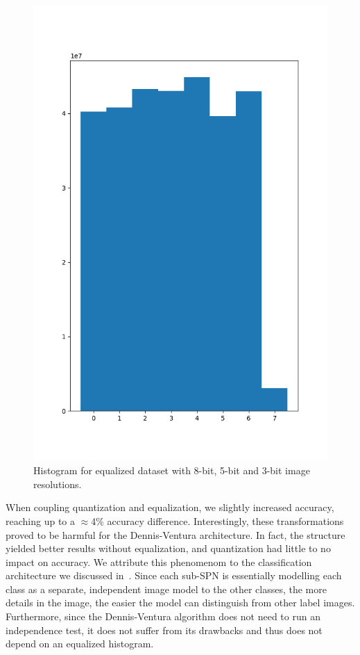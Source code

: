 \begin{figure}[h]
  \includegraphics[scale=0.3]{imgs/hist_3_eq.png}
  \caption{Histogram for equalized dataset with 8-bit, 5-bit and 3-bit image
  resolutions.\label{fig:hist-eq}}
\end{figure}

When coupling quantization and equalization, we slightly increased accuracy, reaching up to a
$\approx$4\% accuracy difference.  Interestingly, these transformations proved to be harmful for
the Dennis-Ventura architecture. In fact, the structure yielded better results without
equalization, and quantization had little to no impact on accuracy. We attribute this phenomenom to
the classification architecture we discussed in~. Since each sub-SPN is
essentially modelling each class as a separate, independent image model to the other classes, the
more details in the image, the easier the model can distinguish from other label images.
Furthermore, since the Dennis-Ventura algorithm does not need to run an independence test, it does
not suffer from its drawbacks and thus does not depend on an equalized histogram.
